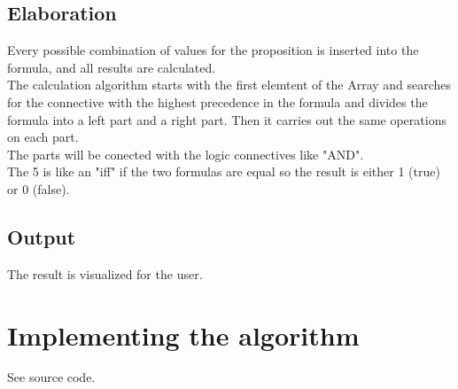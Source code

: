 \documentclass[11pt, a4paper, titlepage, block]{article}
\begin{document}
	\subsection{Elaboration}
	Every possible combination of values for the proposition is inserted into the formula, and all results are calculated.\\
	The calculation algorithm starts with the first elemtent of the Array and searches for the connective with the highest precedence  in the formula and divides the formula into a left part and a right part. Then it carries out the same operations on each part.\\
	The parts will be conected with the logic connectives like "AND". \\
	The 5 is like an "iff" if the two formulas are equal so the result is either 1 (true) or 0 (false). 
	\subsection{Output}
	The result is visualized for the user.
	\newpage
\section{Implementing the algorithm}
	See source code.

	\newpage
\end{document}
